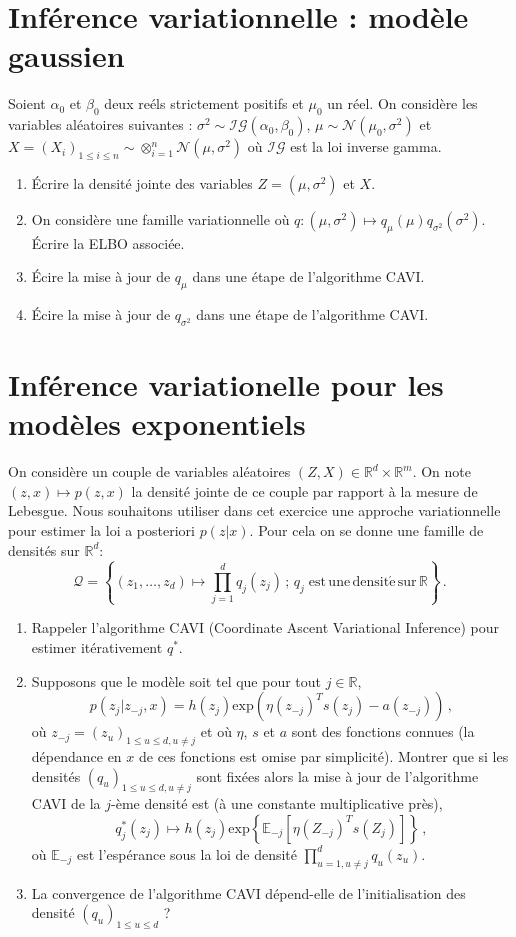 \documentclass[a4paper,10pt,fleqn]{article}
\newcommand{\eqsp}{\,}
\newcommand{\1}{\ensuremath{\mathbbm{1}}}
\begin{document}
\section{Inf\'erence variationnelle : mod\`ele gaussien}
Soient $\alpha_0$ et $\beta_0$ deux re\'els strictement positifs et $\mu_0$ un r\'eel. On consid\`ere les variables al\'eatoires suivantes : $\sigma^2 \sim\mathcal{IG}(\alpha_0,\beta_0)$, $\mu\sim\mathcal{N}(\mu_0,\sigma^2)$ et $X = (X_i)_{1\leq i\leq n}\sim\otimes_{i=1}^n\mathcal{N}(\mu,\sigma^2)$ o\`u $\mathcal{IG}$ est la loi inverse gamma.
\begin{enumerate}
\item \'Ecrire la densit\'e jointe des variables $Z=(\mu,\sigma^2)$ et $X$.
\item On consid\`ere une famille variationnelle o\`u $q:(\mu,\sigma^2)\mapsto q_\mu(\mu)q_{\sigma^2}(\sigma^2)$. \'Ecrire la ELBO associ\'ee.
\item \'Ecire la mise \`a jour de $q_\mu$ dans une \'etape de l'algorithme CAVI. 
\item \'Ecire la mise \`a jour de $q_{\sigma^2}$ dans une \'etape de l'algorithme CAVI. 
\end{enumerate}

\section{Inf\'erence variationelle pour les mod\`eles exponentiels}
On consid\`ere un couple de variables al\'eatoires $(Z,X)\in\mathbb{R}^d\times \mathbb{R}^m$. On note $(z,x) \mapsto p(z,x)$ la densit\'e jointe de ce couple par rapport \`a la mesure de Lebesgue. Nous souhaitons utiliser dans cet exercice une approche variationnelle pour estimer la loi a posteriori $p(z|x)$. Pour cela on se donne une famille de densit\'es sur $\mathbb{R}^d$:
$$
\mathcal{Q} = \left\{(z_1,\ldots,z_d)\mapsto \prod_{j=1}^dq_j(z_j)\eqsp;\eqsp q_j\; \mathrm{est\,une\,densit\acute e\,sur\,\mathbb{R}}\right\}\eqsp.
$$
\begin{enumerate}
\item Rappeler l'algorithme CAVI (Coordinate Ascent Variational Inference) pour estimer it\'erativement $q^*$.
\item Supposons que le mod\`ele soit tel que pour tout $j\in\mathbb{R}$, 
$$
p(z_j|z_{-j},x) = h(z_j)\mathrm{exp}(\eta(z_{-j})^Ts(z_j) - a(z_{-j}))\eqsp,
$$ 
o\`u $z_{-j} = (z_u)_{1\leqslant u\leqslant d, u \neq j}$ et o\`u $\eta$, $s$ et $a$ sont des fonctions connues (la d\'ependance en $x$ de ces fonctions est omise par simplicit\'e). Montrer que si les densit\'es $(q_u)_{1\leqslant u\leqslant d, u \neq j}$ sont fix\'ees alors la mise \`a jour de l'algorithme CAVI de la $j$-\`eme densit\'e est  (\`a une constante multiplicative pr\`es),
$$
q^*_j(z_j) \mapsto h(z_j) \mathrm{exp}\left\{\mathbb{E}_{-j}[\eta(Z_{-j})^Ts(Z_j)]\right\}\eqsp,
$$
o\`u $\mathbb{E}_{-j}$ est l'esp\'erance sous la loi de densit\'e $\prod_{u=1, u\neq j}^d q_u(z_u)$.
\item La convergence de l'algorithme CAVI  d\'epend-elle de l'initialisation des densit\'e $(q_u)_{1\leqslant u\leqslant d}$ ?
\end{enumerate}
\end{document}
